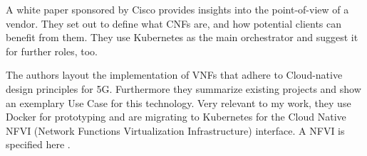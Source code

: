 \begin{description}[style=sameline, leftmargin=1em, font=\normalfont]
	\item [CNF White Paper by Cisco \cite{CNF}] A white paper sponsored by Cisco provides insights into the point-of-view of a vendor. They set out to define what CNFs are, and how potential clients can benefit from them. They use Kubernetes as the main orchestrator and suggest it for further roles, too. 
	
	\item [Cloud-native 5G \cite{inproceedings}] The authors layout the implementation of VNFs that adhere to Cloud-native design principles for 5G. Furthermore they summarize existing projects and show an exemplary Use Case for this technology. Very relevant to my work, they use Docker for prototyping and are migrating to Kubernetes for the Cloud Native NFVI (Network Functions Virtualization Infrastructure) interface. A NFVI is specified here \cite{mijumbi2016network}.
	
	
\end{description}